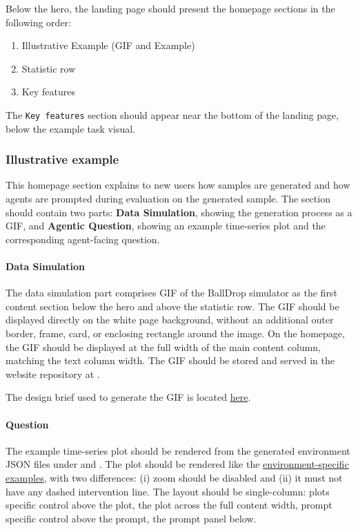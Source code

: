 \documentclass[11pt]{article}
\begin{document}
Below the hero, the landing page should present the homepage sections in the following order:

\begin{enumerate}
  \item Illustrative Example (GIF and Example)
  \item Statistic row
  \item Key features
\end{enumerate}

The \texttt{Key features} section should appear near the bottom of the landing page, below the example task visual.


\subsubsection*{Illustrative example}
This homepage section explains to new users how samples are generated and how agents are prompted during evaluation on the generated sample.
The section should contain two parts: \textbf{Data Simulation}, showing the generation process as a GIF, and \textbf{Agentic Question}, showing an example time-series plot and the corresponding agent-facing question.

\paragraph{Data Simulation}
The data simulation part comprises GIF of the BallDrop simulator as the first content section below the hero and above the statistic row.
The GIF should be displayed directly on the white page background, without an additional outer border, frame, card, or enclosing rectangle around the image.
On the homepage, the GIF should be displayed at the full width of the main content column, matching the text column width.
The GIF should be stored and served in the website repository at .

The design brief used to generate the GIF is located \hyperref[sec:website-ball-drop-gif-prompt]{here}.

\paragraph{Question}
The example time-series plot should be rendered from the generated environment JSON files under  and .
The plot should be rendered like the \hyperref[sec:website-environment-specific-page]{environment-specific examples}, with two differences: (i) zoom should be disabled and (ii) it must not have any dashed intervention line.
The layout should be single-column: plots specific control above the plot, the plot across the full content width, prompt specific control above the prompt,  the prompt panel below.
\end{document}
